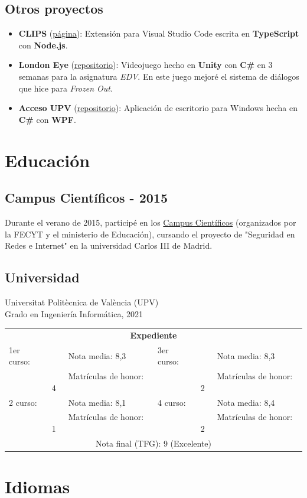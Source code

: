\documentclass[letterpaper, 12pt, dvipsnames]{article}
\newcommand{\uni}{Universitat Politècnica de València (UPV)}
\newcommand{\grade}[1]{Nota media: #1}
\newcommand{\mh}[1]{Matrículas de honor: #1}
\newcommand{\tabitem}{~~\llap{\textbullet}~~}
\newcommand{\unigrades}[9]{
    \begin{tabular}{|ll<{\hspace{1em}}|>{\hspace{1em}}ll|}
        \hline
        \multicolumn{4}{|c|}{\textbf{Expediente}}\\[.5em]
        1er curso: & \tabitem \grade{#1} & 3er curso: & \tabitem \grade{#5} \\
        & \tabitem \mh{#2} && \tabitem \mh{#6} \\
        2{\textdegree} curso: & \tabitem \grade{#3} & 4{\textdegree} curso: & \tabitem \grade{#7} \\
        & \tabitem \mh{#4} && \tabitem \mh{#8} \\
        \multicolumn{4}{|c|}{\rule{0pt}{1.5em}Nota final (TFG): #9}\\
        \hline
    \end{tabular}
}
\newcommand{\myunigrades}{
    \unigrades
    {8,3}
    {4}
    {8,1}
    {1}
    {8,3}
    {2}
    {8,4}
    {2}
    {9 (Excelente)}
}
\begin{document}
    \vspace{1em}

    \subsection{Otros proyectos}

    \begin{itemize}
        \item \textbf{CLIPS} (\href{https://marketplace.visualstudio.com/items?itemName=algono.clips-ide}{página}): Extensión para Visual Studio Code escrita en \textbf{TypeScript} con \textbf{Node.js}.
        \item \textbf{London Eye} (\href{https://github.com/algono/London-Eye}{repositorio}): Videojuego hecho en \textbf{Unity} con \textbf{C\#} en 3 semanas para la asignatura \emph{EDV}. En este juego mejoré el sistema de diálogos que hice para \emph{Frozen Out}.
        \item \textbf{Acceso UPV} (\href{https://github.com/algono/AccesoUPV}{repositorio}): Aplicación de escritorio para Windows hecha en \textbf{C\#} con \textbf{WPF}.
    \end{itemize}

    \section{Educación}

    \subsection{Campus Científicos - 2015}

    Durante el verano de 2015, participé en los \href{https://www.campuscientificos.es/}{Campus Científicos} (organizados por la FECYT y el ministerio de Educación), cursando el proyecto de "Seguridad en Redes e Internet" en la universidad Carlos III de Madrid.

    \subsection{Universidad}

    {\uni}\\
    Grado en Ingeniería Informática, 2021\\

    \myunigrades

    \section{Idiomas}
\end{document}
